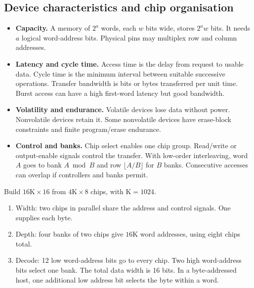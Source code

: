 \documentclass[12pt,a4paper]{article}
\begin{document}
\subsection{Device characteristics and chip organisation}
\begin{itemize}[leftmargin=*,itemsep=3pt]
\item \textbf{Capacity.} A memory of $2^a$ words, each $w$ bits wide, stores $2^aw$ bits. It needs $a$ logical word-address bits. Physical pins may multiplex row and column addresses.
\item \textbf{Latency and cycle time.} Access time is the delay from request to usable data. Cycle time is the minimum interval between suitable successive operations. Transfer bandwidth is bits or bytes transferred per unit time. Burst access can have a high first-word latency but good bandwidth.
\item \textbf{Volatility and endurance.} Volatile devices lose data without power. Nonvolatile devices retain it. Some nonvolatile devices have erase-block constraints and finite program/erase endurance.
\item \textbf{Control and banks.} Chip select enables one chip group. Read/write or output-enable signals control the transfer. With low-order interleaving, word $A$ goes to bank $A\bmod B$ and row $\lfloor A/B\rfloor$ for $B$ banks. Consecutive accesses can overlap if controllers and banks permit.
\end{itemize}
\begin{tcolorbox}[examplebox,title={Build a wider and deeper memory}]
Build $16\mathrm{K}\times16$ from $4\mathrm{K}\times8$ chips, with $\mathrm K=1024$.
\begin{enumerate}[leftmargin=*,itemsep=2pt]
\item Width: two chips in parallel share the address and control signals. One supplies each byte.
\item Depth: four banks of two chips give $16\mathrm K$ word addresses, using eight chips total.
\item Decode: 12 low word-address bits go to every chip. Two high word-address bits select one bank. The total data width is 16 bits. In a byte-addressed host, one additional low address bit selects the byte within a word.
\end{enumerate}
\end{tcolorbox}
\end{document}
